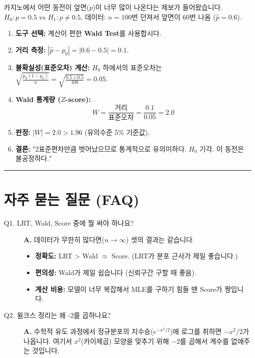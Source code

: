 \documentclass[11pt,a4paper]{book}
\theoremstyle{definition}
\begin{document}
\begin{storybox}[title={Scenario: 카지노의 의심}]
카지노에서 어떤 동전이 앞면($p$)이 너무 많이 나온다는 제보가 들어왔습니다.
$H_0: p = 0.5$ vs $H_1: p \neq 0.5$.
데이터: $n=100$번 던져서 앞면이 60번 나옴 ($\hat{p} = 0.6$).
\end{storybox}

\begin{enumerate}
    \item \textbf{도구 선택:} 계산이 편한 \textbf{Wald Test}를 사용합시다.
    \item \textbf{거리 측정:} $|\hat{p} - p_0| = |0.6 - 0.5| = 0.1$.
    \item \textbf{불확실성(표준오차) 계산:} $H_0$ 하에서의 표준오차는 $\sqrt{\frac{p_0(1-p_0)}{n}} = \sqrt{\frac{0.5 \times 0.5}{100}} = 0.05$.
    \item \textbf{Wald 통계량 ($Z$-score):}
    $$ W = \frac{\text{거리}}{\text{표준오차}} = \frac{0.1}{0.05} = 2.0 $$
    \item \textbf{판정:} $|W| = 2.0 > 1.96$ (유의수준 5\% 기준값).
    \item \textbf{결론:} "2표준편차만큼 벗어났으므로 통계적으로 유의미하다. $H_0$ 기각. 이 동전은 불공정하다."
\end{enumerate}

\vspace{0.5cm}\hrule\vspace{0.5cm}

\section{자주 묻는 질문 (FAQ)}

\begin{description}
    \item[Q1. LRT, Wald, Score 중에 뭘 써야 하나요?]
    \textbf{A.} 데이터가 무한히 많다면($n \to \infty$) 셋의 결과는 같습니다.
    \begin{itemize}
        \item \textbf{정확도:} LRT > Wald $\approx$ Score. (LRT가 분포 근사가 제일 좋습니다.)
        \item \textbf{편의성:} Wald가 제일 쉽습니다 (신뢰구간 구할 때 좋음).
        \item \textbf{계산 비용:} 모델이 너무 복잡해서 MLE를 구하기 힘들 땐 Score가 짱입니다.
    \end{itemize}
    
    \item[Q2. 윌크스 정리는 왜 -2를 곱하나요?]
    \textbf{A.} 수학적 유도 과정에서 정규분포의 지수승($e^{-x^2/2}$)에 로그를 취하면 $-x^2/2$가 나옵니다. 여기서 $x^2$(카이제곱) 모양을 맞추기 위해 $-2$를 곱해서 계수를 없애주는 것입니다.
\end{description}
\end{document}

